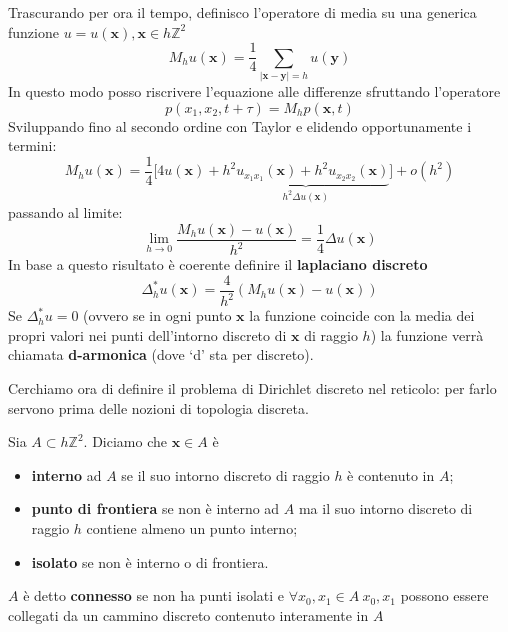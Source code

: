 \documentclass[10pt,a4paper,twoside,openright]{book}
\newcommand{\x}{\mathbf{x}}
\newcommand{\y}{\mathbf{y}}
\begin{document}
Trascurando per ora il tempo, definisco l'operatore di media su una generica funzione $u=u(\x),\x\in h\mathbb{Z}^{2}$
\begin{equation*}
    M_{h} u(\x) =\frac{1}{4}\sum _{| \x-\y| =h} u(\y)
\end{equation*}
In questo modo posso riscrivere l'equazione alle differenze sfruttando l'operatore
\begin{equation*}
    p(x_{1},x_{2},t+\tau) =M_{h} p(\x,t)
\end{equation*}
Sviluppando fino al secondo ordine con Taylor e elidendo opportunamente i termini:
\begin{equation*}
    M_{h} u(\x) =\frac{1}{4}\bigg[4u(\x) +\underbrace{h^{2} u_{x_{1} x_{1}}(\x) +h^{2} u_{x_{2} x_{2}}(\x)}_{h^{2} \Delta u(\x)}\bigg] +o\left(h^{2}\right)
\end{equation*}
passando al limite:
\begin{equation*}
    \lim _{h\rightarrow 0}\frac{M_{h} u(\x) -u(\x)}{h^{2}} =\frac{1}{4} \Delta u(\x)
\end{equation*}
In base a questo risultato è coerente definire il \textbf{laplaciano discreto}
\begin{equation}
    \Delta ^{*}_{h} u(\x) =\frac{4}{h^{2}}(M_{h} u(\x) -u(\x))
\end{equation}
Se $\displaystyle \Delta ^{*}_{h} u=0$ (ovvero se in ogni punto $\x$ la funzione coincide con la media dei propri valori nei punti dell'intorno discreto di $\x$ di raggio $h$) la funzione verrà chiamata \textbf{d-armonica} (dove `d' sta per discreto).

Cerchiamo ora di definire il problema di Dirichlet discreto nel reticolo: per farlo servono prima delle nozioni di topologia discreta.

Sia $\displaystyle A \subset h\mathbb{Z}^{2}$. Diciamo che $\x\in A$ è
\begin{itemize}
    \item \textbf{interno} ad $A$ se il suo intorno discreto di raggio $h$ è contenuto in $A$;
    \item \textbf{punto di frontiera} se non è interno ad $A$ ma il suo intorno discreto di raggio $h$ contiene almeno un punto interno;
    \item \textbf{isolato} se non è interno o di frontiera.
\end{itemize}

$A$ è detto \textbf{connesso} se non ha punti isolati e $\displaystyle \forall x_{0},x_{1} \in A\ x_{0},x_{1}$ possono essere collegati da un cammino discreto contenuto interamente in $A$
\end{document}
